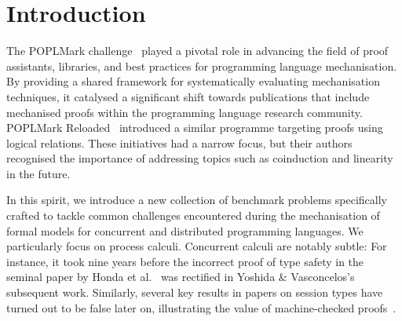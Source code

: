 \documentclass[runningheads]{llncs}
\begin{document}
\section{Introduction}

The POPLMark challenge~\cite{POPLMark}
played a pivotal role in advancing the field of proof assistants,
libraries, and best practices for programming language
mechanisation. By providing a shared framework for systematically
evaluating mechanisation techniques, it catalysed a significant
shift towards publications that include mechanised proofs within the programming language research community.
POPLMark Reloaded~\cite{POPLMarkReloaded} introduced a similar programme targeting proofs using logical relations.
These initiatives had a narrow focus, but their authors recognised the importance of addressing topics such as coinduction and linearity in the future.

In this spirit, we introduce a new collection of benchmark problems
specifically crafted to tackle common challenges encountered during
the mechanisation of formal models for concurrent and distributed
programming languages.
We particularly focus on process calculi.
Concurrent calculi are notably subtle: For instance, it took nine
years before the incorrect proof of type safety in the seminal paper
by Honda et al.~\cite{Honda1998} was rectified in Yoshida \&
Vasconcelos’s subsequent work\cite{Yoshida2007}.
Similarly, several key results in papers on session types have turned out
to be false later on, illustrating the
value of machine-checked proofs~\cite{Gay2020,10.1145/3290343}.
\end{document}
